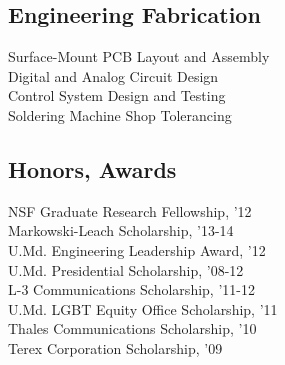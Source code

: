 \documentclass[letterpaper]{deedy-resume} %
\begin{document}
\begin{minipage}[t]{0.33\textwidth}
\sectionspace

\subsection{Engineering Fabrication}

Surface-Mount PCB Layout and Assembly\\
Digital and Analog Circuit Design\\
Control System Design and Testing\\
Soldering \textbullet{} Machine Shop \textbullet{} Tolerancing\\


\sectionspace %

\subsection{Honors, Awards}

NSF Graduate Research Fellowship, '12\\
Markowski-Leach Scholarship, '13-14\\
U.Md. Engineering Leadership Award, '12\\
U.Md. Presidential Scholarship, '08-12\\
L-3 Communications Scholarship, '11-12\\
U.Md. LGBT Equity Office Scholarship, '11\\
Thales Communications Scholarship, '10\\
Terex Corporation Scholarship, '09\\

\end{minipage}%
\hfill
%
%
\end{document}
